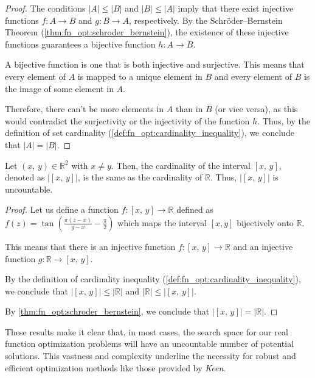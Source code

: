    \begin{proof}
        The conditions \(|A| \leq |B|\) and \(|B| \leq |A|\) imply that there exist injective functions 
        \(f: A \rightarrow B\) and \(g: B \rightarrow A\), respectively. By the Schröder--Bernstein Theorem 
        (\vref{thm:fn_opt:schroder_bernstein}), the existence of these injective functions guarantees a bijective 
        function \(h: A \rightarrow B\).

        A bijective function is one that is both injective and surjective. This means that every element of \(A\) is 
        mapped to a unique element in \(B\) and every element of \(B\) is the image of some element in \(A\).

        Therefore, there can't be more elements in \(A\) than in \(B\) (or vice versa), as this would contradict the 
        surjectivity or the injectivity of the function \(h\). Thus, by the definition of set cardinality 
        (\vref{def:fn_opt:cardinality_inequality}), we conclude that \(|A| = |B|\).
    \end{proof}

    \begin{theorem}
    \label{thm:fn_opt:cardinality}
        Let $(x,\,y) \in \mathbb{R}^2$ with $x \neq y$. Then, the cardinality of the interval $[x,\,y]$, denoted as 
        $|[x,\,y]|$, is the same as the cardinality of \(\mathbb{R}\). Thus, $|[x,\,y]|$ is uncountable.
    \end{theorem}

    \begin{proof}
        Let us define a function \(f: [x,\,y] \rightarrow \mathbb{R}\) defined as \(f(z) = 
        \tan\left(\frac{\pi(z-x)}{y-x} - \frac{\pi}{2}\right)\) which maps the interval \([x, y]\) bijectively onto 
        \(\mathbb{R}\).
        
        This means that there is an injective function \(f: [x,\,y] \rightarrow \mathbb{R}\) and an injective function 
        \(g: \mathbb{R} \rightarrow [x,\,y]\).

        By the definition of cardinality inequality (\vref{def:fn_opt:cardinality_inequality}), we conclude that 
        \(|[x,\,y]| \leq |\mathbb{R}|\) and \(|\mathbb{R}| \leq |[x,\,y]|\).

        By \vref{thm:fn_opt:schroder_bernstein}, we conclude that \(|[x,\,y]| = |\mathbb{R}|\).
    \end{proof}    

    These results make it clear that, in most cases, the search space for our real function optimization problems will 
    have an uncountable number of potential solutions. This vastness and complexity underline the necessity for robust 
    and efficient optimization methods like those provided by \textit{Keen}.
